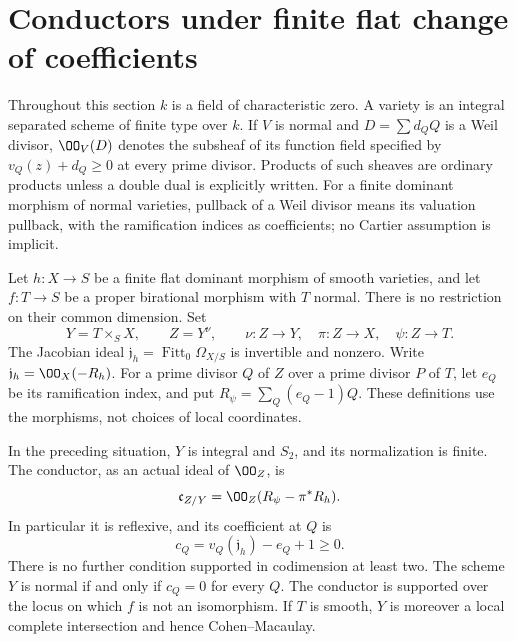 \section{Conductors under finite flat change of coefficients}
\label{sec:duality-base-change-v171}
Throughout this section $k$ is a field of characteristic zero. A variety is
an integral separated scheme of finite type over $k$. If $V$ is normal and
$D=\sum d_QQ$ is a Weil divisor, $\OO_V(D)$ denotes the subsheaf of its
function field specified by $v_Q(z)+d_Q\geq0$ at every prime divisor.
Products of such sheaves are ordinary products unless a double dual is
explicitly written. For a finite dominant morphism of normal varieties,
pullback of a Weil divisor means its valuation pullback, with the
ramification indices as coefficients; no Cartier assumption is implicit.

Let $h:X\to S$ be a finite flat dominant morphism of smooth varieties,
and let $f:T\to S$ be a proper birational morphism with $T$ normal.
There is no restriction on their common dimension. Set
\[
 Y=T\times_S X,\qquad Z=Y^\nu,
 \qquad \nu:Z\longrightarrow Y,\quad
 \pi:Z\longrightarrow X,\quad \psi:Z\longrightarrow T.
\]
The Jacobian ideal $\mathfrak j_h=\operatorname{Fitt}_0\Omega_{X/S}$ is
invertible and nonzero. Write $\mathfrak j_h=\OO_X(-R_h)$. For a prime
divisor $Q$ of $Z$ over a prime divisor $P$ of $T$, let $e_Q$ be its
ramification index, and put $R_\psi=\sum_Q(e_Q-1)Q$.
These definitions use the morphisms, not choices of local coordinates.

\begin{theorem}
\label{thm:duality-conductor-v171}
In the preceding situation, $Y$ is integral and $S_2$, and its
normalization is finite. The conductor, as an actual ideal of $\OO_Z$, is
\begin{equation}\label{eq:duality-conductor-v171}
 \mathfrak c_{Z/Y}
 =\OO_Z(R_\psi-\pi^*R_h).
\end{equation}
In particular it is reflexive, and its coefficient at $Q$ is
\begin{equation}\label{eq:jacobian-order-v171}
 c_Q=v_Q(\mathfrak j_h)-e_Q+1\geq0.
\end{equation}
There is no further condition supported in codimension at least two.
The scheme $Y$ is normal if and only if $c_Q=0$ for every $Q$.
The conductor is supported over the locus on which $f$ is not an
isomorphism. If $T$ is smooth, $Y$ is moreover a local complete
intersection and hence Cohen--Macaulay.
\end{theorem}

